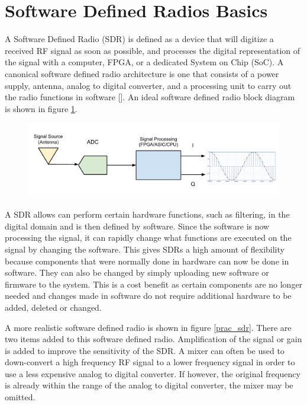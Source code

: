  
\section{Software Defined Radios Basics} 
A Software Defined Radio (SDR) is defined as a device that will digitize a received RF signal as soon as possible, and processes the digital representation of the signal with a computer, FPGA, or a dedicated System on Chip (SoC).  A canonical software defined radio architecture is one that consists of a power supply, antenna, analog to digital converter, and a processing unit to carry out the radio functions in software [\cite{Mitola1995}]. An ideal software defined radio block diagram is shown in figure \ref{ideal_sdr}.

{\begin{figure}[h!tb] 
\centering
\includegraphics[width=\textwidth]{Images/SDR_Ideal_block.pdf}
\label{ideal_sdr}
\end{figure}
}

A SDR allows can perform certain hardware functions, such as filtering, in the digital domain and is then defined by software.  Since the software is now processing the signal, it can rapidly change what functions are executed on the signal by changing the software.  This gives SDRs a high amount of flexibility because components that were normally done in hardware can now be done in software.  They can also be changed by simply uploading new software or firmware to the system.  This is a cost benefit as certain components are no longer needed and changes made in software do not require additional hardware to be added, deleted or changed.

A more realistic software defined radio is shown in figure \ref{prac_sdr}.  There are two items added to this software defined radio.  Amplification of the signal or gain is added to improve the sensitivity of the SDR.  A mixer can often be used to down-convert a high frequency RF signal to a lower frequency signal in order to use a less expensive analog to digital converter.  If however, the original frequency is already within the range of the analog to digital converter, the mixer may be omitted.  

